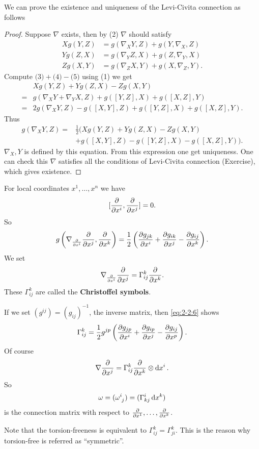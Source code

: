 \documentclass[12pt]{article}
\begin{document}
We can prove the existence and uniqueness of the Levi-Civita connection as follows
\begin{proof}
    Suppose \(\nabla\) exists, then by (2) \(\nabla\) should satisfy
    \begin{align}
        Xg(Y,Z)&=g(\nabla_X Y,Z)+g(Y,\nabla_X,Z) \tag{3} \\
        Yg(Z,X)&=g(\nabla_Y Z,X)+g(Z,\nabla_Y,X) \tag{4} \\
        Zg(X,Y)&=g(\nabla_Z X,Y)+g(X,\nabla_Z,Y) \tag{5}
    .\end{align}
    Compute \(\text{(3)}+\text{(4)}-\text{(5)}\) using (1) we get
    \begin{align*}
        &Xg(Y,Z)+Yg(Z,X)-Zg(X,Y) \\
        =&g(\nabla_X Y+\nabla_Y X,Z)+g([Y,Z],X)+g([X,Z],Y) \\
        =&2g(\nabla_X Y,Z)-g([X,Y],Z)+g([Y,Z],X)+g([X,Z],Y)
    .\end{align*}
    Thus 
    \begin{align*}
        g(\nabla_X Y,Z)=&\frac{1}{2}\big(Xg(Y,Z)+Yg(Z,X)-Zg(X,Y) \\
        &+g([X,Y],Z)-g([Y,Z],X)-g([X,Z],Y)\big)
    .\end{align*}
    \(\nabla_X,Y\) is defined by this equation. From this expression one get
    uniqueness. One can check this \(\nabla\) satisfies all the conditions of
    Levi-Civita connection (Exercise), which gives existence.
\end{proof}

For local coordinates \(x^1,\ldots,x^n\) we have \[
    [\pdv{x^i},\pdv{x^j}]=0
.\] So
\begin{equation}\label{eq:2-2:6}
    g\left(\nabla_{\pdv{x^i}}\pdv{x^j},\pdv{x^k}\right)
    =\frac{1}{2}\left(\pdv{g_{jk}}{x^i}+\pdv{g_{ik}}{x^j}-\pdv{g_{ij}}{x^k}\right)
.\end{equation}
We set \[
    \nabla_{\pdv{x^i}}\pdv{x^j}=\Gamma_{ij}^k\pdv{x^k}
.\] These \(\Gamma_{ij}^k\) are called the \textbf{Christoffel symbols}.

If we set \((g^{ij})=(g_{ij})^{-1}\), the inverse matrix, then \cref{eq:2-2:6} shows \[
    \Gamma_{ij}^k=\frac{1}{2}g^{jp}\left(\pdv{g_{jp}}{x^i}+\pdv{g_{ip}}{x^j}
    -\pdv{g_{ij}}{x^p}\right)
.\] Of course \[
    \nabla\pdv{x^j}=\Gamma_{ij}^k\pdv{x^k}\otimes \dd{x^i}
.\] So \[
    \omega=(\tensor{\omega}{^i_j})=(\Gamma_{kj}^i\dd{x^k})
\] is the connection matrix with respect to \(\pdv{x^1},\ldots,\pdv{x^k}\).

Note that the torsion-freeness is equivalent to \(\Gamma_{ij}^k=\Gamma_{ji}^k\). This
is the reason why torsion-free is referred as ``symmetric''.
\end{document}

